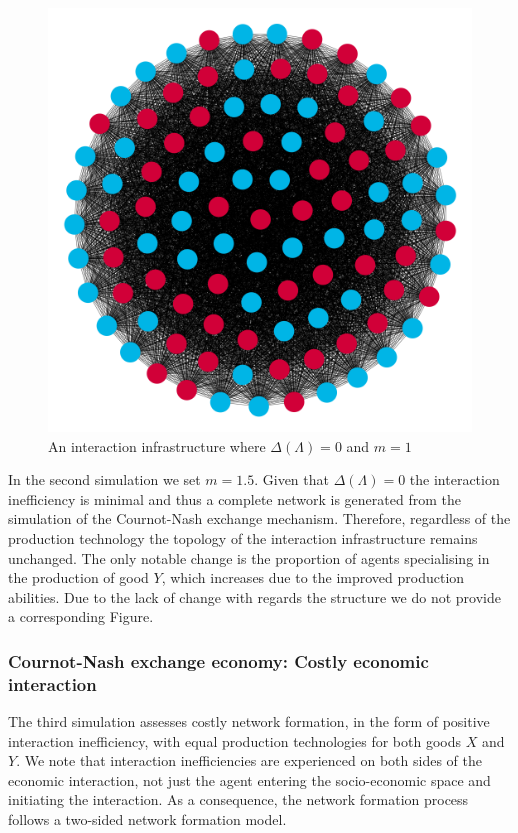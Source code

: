 \begin{figure}[t]
\centering
\includegraphics[scale=0.22]{imgs/Sim1C.png}
\caption{An interaction infrastructure where $\Delta(\Lambda)=0$ and $m=1$}
\label{Sim5}
\end{figure}

In the second simulation we set $m = 1.5$. Given that $\Delta(\Lambda) = 0$ the interaction inefficiency is minimal and thus a complete network is generated from the simulation of the Cournot-Nash exchange mechanism. Therefore, regardless of the production technology the topology of the interaction infrastructure remains unchanged. The only notable change is the proportion of agents specialising in the production of good $Y$, which increases due to the improved production abilities. Due to the lack of change with regards the structure we do not provide a corresponding Figure.

\subsubsection{Cournot-Nash exchange economy: Costly economic interaction}

The third simulation assesses costly network formation, in the form of positive interaction inefficiency, with equal production technologies for both goods $X$ and $Y$. We note that interaction inefficiencies are experienced on both sides of the economic interaction, not just the agent entering the socio-economic space and initiating the interaction. As a consequence, the network formation process follows a two-sided network formation model.

